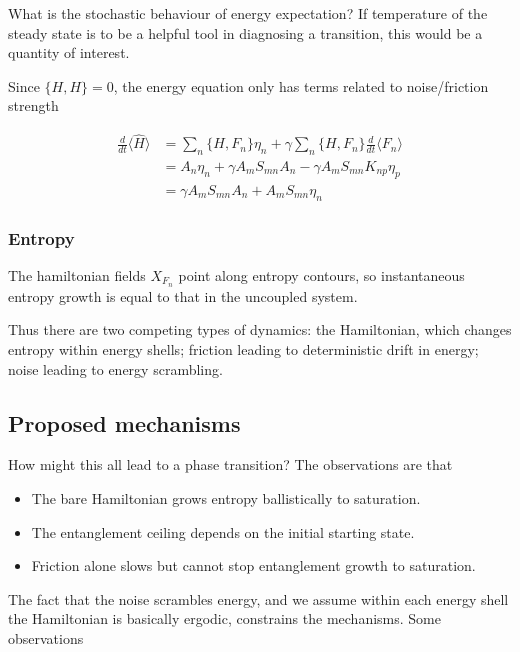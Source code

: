         What is the stochastic behaviour of energy expectation? If temperature of the steady state is to be a helpful tool in diagnosing a transition, this would be a quantity of interest.

        Since $\{H, H\}=0$, the energy equation only has terms related to noise/friction strength 

        \begin{align}
            \frac{d}{dt}\langle \hat H \rangle &= \sum_n\{H, F_n\}\eta_n + \gamma \sum_n\{H, F_n\}\frac{d}{dt}\langle F_n\rangle \nonumber \\
            &= A_n\eta_n+ \gamma A_m S_{mn}A_n - \gamma A_mS_{mn}K_{np}\eta_p \nonumber \\
            &= \gamma A_m S_{mn}A_n + A_mS_{mn}\eta_n
        \end{align}

    \subsubsection{Entropy}
        The hamiltonian fields $X_{F_n}$ point along entropy contours, so instantaneous entropy growth is equal to that in the uncoupled system.

        Thus there are two competing types of dynamics: the Hamiltonian, which changes entropy within energy shells; friction leading to deterministic drift in energy; noise leading to energy scrambling.

    \subsection{Proposed mechanisms}

        How might this all lead to a phase transition? The observations are that
        
        \begin{itemize}
            \item The bare Hamiltonian grows entropy ballistically to saturation.

            \item The entanglement ceiling depends on the initial starting state.

            \item Friction alone slows but cannot stop entanglement growth to saturation.
        \end{itemize}
        
        The fact that the noise scrambles energy, and we assume within each energy shell the Hamiltonian is basically ergodic, constrains the mechanisms. Some observations

